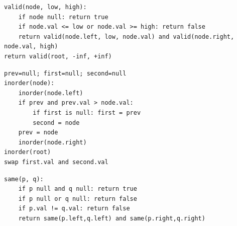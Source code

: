 \documentclass[11pt,a4paper]{ctexart}
\begin{document}
\begin{verbatim}
valid(node, low, high):
    if node null: return true
    if node.val <= low or node.val >= high: return false
    return valid(node.left, low, node.val) and valid(node.right, node.val, high)
return valid(root, -inf, +inf)
\end{verbatim}

\begin{verbatim}
prev=null; first=null; second=null
inorder(node):
    inorder(node.left)
    if prev and prev.val > node.val:
        if first is null: first = prev
        second = node
    prev = node
    inorder(node.right)
inorder(root)
swap first.val and second.val
\end{verbatim}

\begin{verbatim}
same(p, q):
    if p null and q null: return true
    if p null or q null: return false
    if p.val != q.val: return false
    return same(p.left,q.left) and same(p.right,q.right)
\end{verbatim}
\end{document}
